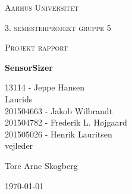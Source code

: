 \thispagestyle{empty}
	{\centering
	{\scshape\LARGE Aarhus Universitet \par}
	\vspace{1cm}
	{\scshape\Large 3. semesterprojekt gruppe 5\par}
	{\scshape\Large Projekt rapport\par}
	\vspace{1.5cm}
	{\huge\bfseries SensorSizer\par}
	\vspace{2cm}
	{\Large
	13114 - Jeppe Hansen\\ 
	Laurids\\
	201504663 - Jakob Wilbrandt\\ 
	201504782 - Frederik L. Højgaard\\ 
	201505026 - Henrik Lauritsen\\ }
	\vfill
	vejleder\par
	Tore Arne Skogberg

	\vfill

	{\large \today\par}
\par}


